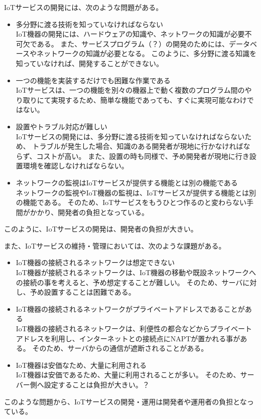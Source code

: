 IoTサービスの開発には、次のような問題がある。
\begin{itemize}
\item 多分野に渡る技術を知っていなければならない\\
	IoT機器の開発には、ハードウェアの知識や、ネットワークの知識が必要不可欠である。
	また、サービスプログラム（？）の開発のためには、データベースやネットワークの知識が必要となる。
	このように、多分野に渡る知識を知っていなければ、開発することができない。
\item 一つの機能を実装するだけでも困難な作業である\\
	IoTサービスは、一つの機能を別々の機器上で動く複数のプログラム間のやり取りにて実現するため、簡単な機能であっても、すぐに実現可能なわけではない。
\item 設置やトラブル対応が難しい\\
	IoTサービスの開発には、多分野に渡る技術を知っていなければならないため、
	トラブルが発生した場合、知識のある開発者が現地に行かなければならず、コストが高い。
	また、設置の時も同様で、予め開発者が現地に行き設置環境を確認しなければならない。
\item ネットワークの監視はIoTサービスが提供する機能とは別の機能である\\
	ネットワークの監視やIoT機器の監視は、IoTサービスが提供する機能とは別の機能である。
	そのため、IoTサービスをもうひとつ作るのと変わらない手間がかかり、開発者の負担となっている。
\end{itemize}
このように、IoTサービスの開発は、開発者の負担が大きい。

また、IoTサービスの維持・管理においては、次のような課題がある。
\begin{itemize}
\item IoT機器の接続されるネットワークは想定できない\\
	IoT機器が接続されるネットワークは、IoT機器の移動や既設ネットワークへの接続の事を考えると、予め想定することが難しい。
	そのため、サーバに対し、予め設置することは困難である。
\item IoT機器の接続されるネットワークがプライベートアドレスであることがある\\
	IoT機器の接続されるネットワークは、利便性の都合などからプライベートアドレスを利用し、インターネットとの接続点にNAPTが置かれる事がある。
	そのため、サーバからの通信が遮断されることがある。
\item IoT機器は安価なため、大量に利用される\\
	IoT機器は安価であるため、大量に利用されることが多い。
	そのため、サーバー側へ設定することは負担が大きい。？
\end{itemize}
このような問題から、IoTサービスの開発・運用は開発者や運用者の負担となっている。


